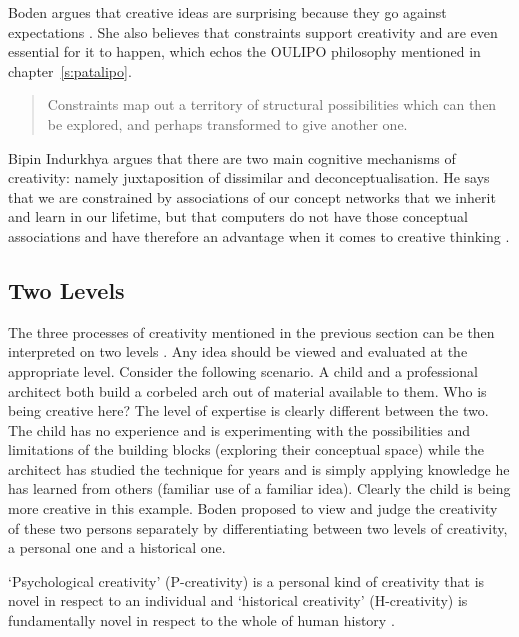 Boden argues that creative ideas are surprising because they go against expectations \citeyear{Boden2003}. She also believes that constraints support creativity and are even essential for it to happen, which echos the \ac{OULIPO} philosophy mentioned in chapter~\ref{s:patalipo}.

\begin{quotation}
  Constraints map out a territory of structural possibilities which can then be explored, and perhaps transformed to give another one. 
\end{quotation}

Bipin Indurkhya argues that there are two main cognitive mechanisms of creativity: namely juxtaposition of dissimilar and deconceptualisation. He says that we are constrained by associations of our concept networks that we inherit and learn in our lifetime, but that computers do not have those conceptual associations and have therefore an advantage when it comes to creative thinking \autocite{Indurkhya}.


\subsection{Two Levels}

The three processes of creativity mentioned in the previous section can be then interpreted on two levels \autocite{Boden2003}. Any idea should be viewed and evaluated at the appropriate level. Consider the following scenario. A child and a professional architect both build a corbeled arch out of material available to them. Who is being creative here? The level of expertise is clearly different between the two. The child has no experience and is experimenting with the possibilities and limitations of the building blocks (exploring their conceptual space) while the architect has studied the technique for years and is simply applying knowledge he has learned from others (familiar use of a familiar idea). Clearly the child is being more creative in this example. Boden proposed to view and judge the creativity of these two persons separately by differentiating between two levels of creativity, a personal one and a historical one. 

`Psychological creativity' (P-creativity) is a personal kind of creativity that is novel in respect to an individual and `historical creativity' (H-creativity) is fundamentally novel in respect to the whole of human history \autocite{Boden2003}. 

